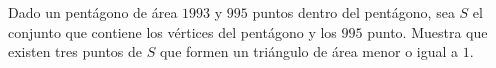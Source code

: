 Dado un pentágono de área $1993$ y $995$ puntos dentro del pentágono, sea $S$ el conjunto que contiene los vértices del pentágono y los $995$ punto. Muestra que existen tres puntos de $S$ que formen un triángulo de área menor o igual a $1$. 